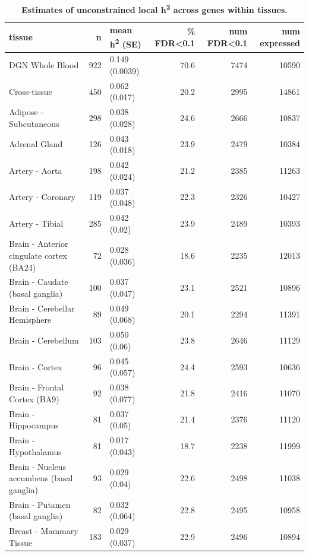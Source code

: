 \documentclass[10pt,letterpaper]{article}
\begin{document}
\begin{table}[!ht]
\begin{adjustwidth}{-2.25in}{0in} %
\caption{
{\bf Estimates of unconstrained local h\textsuperscript{2} across genes within tissues.}}
\begin{tabular}{lrlrrr}
 \hline
tissue & n & mean h\textsuperscript{2} (SE) & \% FDR\textless{}0.1 & num FDR\textless{}0.1 & num expressed \\ 
  \hline
DGN Whole Blood & 922 & 0.149 (0.0039) & 70.6 & 7474 & 10590 \\ 
  Cross-tissue & 450 & 0.062 (0.017) & 20.2 & 2995 & 14861 \\ 
  Adipose - Subcutaneous & 298 & 0.038 (0.028) & 24.6 & 2666 & 10837 \\ 
  Adrenal Gland & 126 & 0.043 (0.018) & 23.9 & 2479 & 10384 \\ 
  Artery - Aorta & 198 & 0.042 (0.024) & 21.2 & 2385 & 11263 \\ 
  Artery - Coronary & 119 & 0.037 (0.048) & 22.3 & 2326 & 10427 \\ 
  Artery - Tibial & 285 & 0.042 (0.02) & 23.9 & 2489 & 10393 \\ 
  Brain - Anterior cingulate cortex (BA24) & 72 & 0.028 (0.036) & 18.6 & 2235 & 12013 \\ 
  Brain - Caudate (basal ganglia) & 100 & 0.037 (0.047) & 23.1 & 2521 & 10896 \\ 
  Brain - Cerebellar Hemisphere & 89 & 0.049 (0.068) & 20.1 & 2294 & 11391 \\ 
  Brain - Cerebellum & 103 & 0.050 (0.06) & 23.8 & 2646 & 11129 \\ 
  Brain - Cortex & 96 & 0.045 (0.057) & 24.4 & 2593 & 10636 \\ 
  Brain - Frontal Cortex (BA9) & 92 & 0.038 (0.077) & 21.8 & 2416 & 11070 \\ 
  Brain - Hippocampus & 81 & 0.037 (0.05) & 21.4 & 2376 & 11120 \\ 
  Brain - Hypothalamus & 81 & 0.017 (0.043) & 18.7 & 2238 & 11999 \\ 
  Brain - Nucleus accumbens (basal ganglia) & 93 & 0.029 (0.04) & 22.6 & 2498 & 11038 \\ 
  Brain - Putamen (basal ganglia) & 82 & 0.032 (0.064) & 22.8 & 2495 & 10958 \\ 
  Breast - Mammary Tissue & 183 & 0.029 (0.037) & 22.9 & 2496 & 10894 \\ 

\end{tabular}
\end{adjustwidth}
\end{table}
\end{document}

